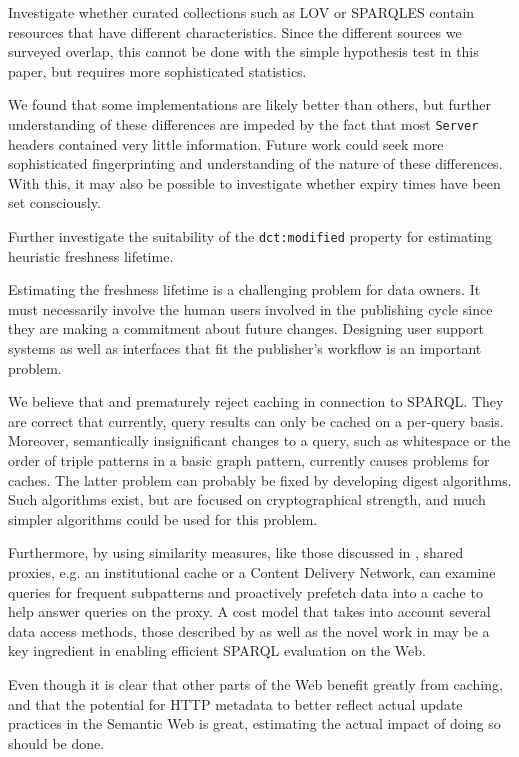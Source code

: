 \documentclass{llncs}
\newcommand{\rdfterm}[1]{\texttt{#1}}
\newcommand{\httph}[1]{\texttt{#1}}
\begin{document}
Investigate whether curated collections such as LOV or SPARQLES
contain resources that have different characteristics. Since the
different sources we surveyed overlap, this cannot be done with the
simple hypothesis test in this paper, but requires more sophisticated
statistics.

We found that some implementations are likely better than others, but
further understanding of these differences are impeded by the fact
that most \httph{Server} headers contained very little
information. Future work could seek more sophisticated fingerprinting
and understanding of the nature of these differences. With this, it
may also be possible to investigate whether expiry times have been set
consciously.

Further investigate the suitability of the \rdfterm{dct:modified}
property for estimating heuristic freshness lifetime.

Estimating the freshness lifetime is a challenging problem for data
owners. It must necessarily involve the human users involved in the
publishing cycle since they are making a commitment about future
changes. Designing user support systems as well as interfaces that fit
the publisher's workflow is an important problem.

We believe that  \cite{ldf1} and \cite{hogan2014paths} prematurely
reject caching in connection to SPARQL. They are correct that
currently, query results can only be cached on a per-query
basis. Moreover, semantically insignificant changes to a query, such
as whitespace or the order of triple patterns in a basic graph
pattern, currently causes problems for caches. The latter problem can
probably be fixed by developing digest algorithms. Such algorithms
exist, but are focused on cryptographical strength, and much simpler
algorithms could be used for this problem.

Furthermore, by using similarity measures, like those discussed in
\cite{dividino2013following}, shared proxies, e.g. an institutional
cache or a Content Delivery Network, can examine queries for frequent
subpatterns and proactively prefetch data into a cache to help answer
queries on the proxy. A cost model that takes into account several
data access methods, those described by \cite{hogan2014paths} as well
as the novel work in \cite{ldf1} may be a key ingredient in enabling
efficient SPARQL evaluation on the Web.


Even though it is clear that other parts of the Web benefit greatly
from caching, and that the potential for HTTP metadata to better
reflect actual update practices in the Semantic Web is great,
estimating the actual impact of doing so should be done.
\end{document}
